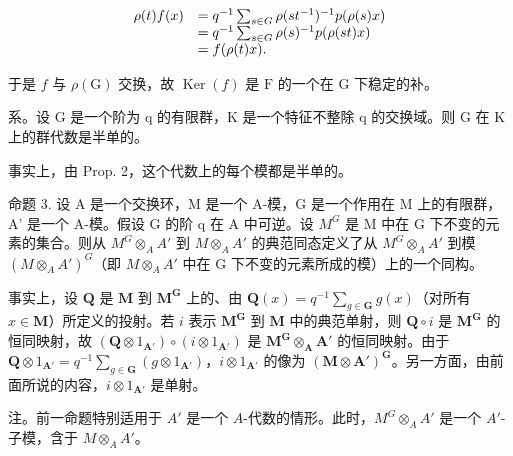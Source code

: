 \[
\begin{array}{r l} \rho (t) f (x) & = q ^ {- 1} \sum_ {s \in G} \rho (s t ^ {- 1}) ^ {- 1} p (\rho (s) x) \\ & = q ^ {- 1} \sum_ {s \in G} \rho (s) ^ {- 1} p (\rho (s t) x) \\ & = f (\rho (t) x). \end{array}
\]

于是 \(f\) 与 \(\rho(\mathrm{G})\) 交换，故 \(\operatorname{Ker}(f)\) 是 \(\mathrm{F}\) 的一个在 \(\mathrm{G}\) 下稳定的补。

系。设 G 是一个阶为 q 的有限群，K 是一个特征不整除 q 的交换域。则 G 在 K 上的群代数是半单的。

事实上，由 Prop. 2，这个代数上的每个模都是半单的。

命题 3. 设 A 是一个交换环，M 是一个 A-模，G 是一个作用在 M 上的有限群，A' 是一个 A-模。假设 G 的阶 q 在 A 中可逆。设 \(M^{G}\) 是 M 中在 G 下不变的元素的集合。则从 \(M^{G} \otimes_{A} A'\) 到 \(M \otimes_{A} A'\) 的典范同态定义了从 \(M^{G} \otimes_{A} A'\) 到模 \((M \otimes_{A} A')^{G}\)（即 \(M \otimes_{A} A'\) 中在 G 下不变的元素所成的模）上的一个同构。

事实上，设 \(\mathbf{Q}\) 是 \(\mathbf{M}\) 到 \(\mathbf{M}^{\mathbf{G}}\) 上的、由 \(\mathbf{Q}(x) = q^{-1}\sum_{g\in \mathbf{G}}g(x)\)（对所有 \(x\in \mathbf{M}\)）所定义的投射。若 \(i\) 表示 \(\mathbf{M}^{\mathbf{G}}\) 到 \(\mathbf{M}\) 中的典范单射，则 \(\mathbf{Q}\circ i\) 是 \(\mathbf{M}^{\mathbf{G}}\) 的恒同映射，故 \((\mathbf{Q}\otimes 1_{\mathbf{A}'})\circ (i\otimes 1_{\mathbf{A}'})\) 是 \(\mathbf{M}^{\mathbf{G}}\otimes_{\mathbf{A}}\mathbf{A}'\) 的恒同映射。由于 \(\mathbf{Q}\otimes 1_{\mathbf{A}'} = q^{-1}\sum_{g\in \mathbf{G}}(g\otimes 1_{\mathbf{A}'})\)，\(i\otimes 1_{\mathbf{A}'}\) 的像为 \((\mathbf{M}\otimes \mathbf{A}')^{\mathbf{G}}\)。另一方面，由前面所说的内容，\(i\otimes 1_{\mathbf{A}'}\) 是单射。

注。前一命题特别适用于 \(A'\) 是一个 \(A\)-代数的情形。此时，\(M^G \otimes_A A'\) 是一个 \(A'\)-子模，含于 \(M \otimes_A A'\)。


